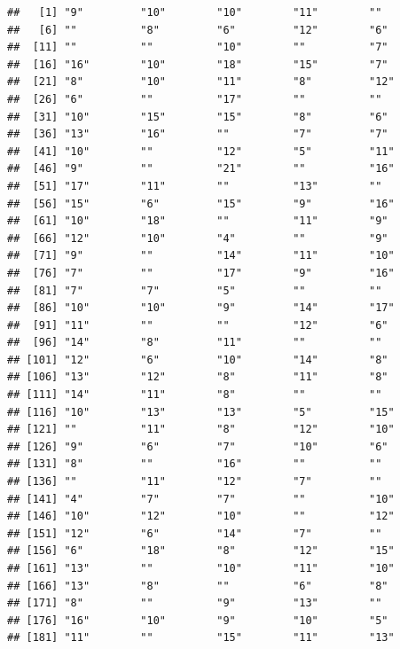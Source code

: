 \documentclass[]{book}
\theoremstyle{definition}
\theoremstyle{definition}
\theoremstyle{definition}
\theoremstyle{remark}
\begin{document}
\begin{verbatim}
##   [1] "9"         "10"        "10"        "11"        ""         
##   [6] ""          "8"         "6"         "12"        "6"        
##  [11] ""          ""          "10"        ""          "7"        
##  [16] "16"        "10"        "18"        "15"        "7"        
##  [21] "8"         "10"        "11"        "8"         "12"       
##  [26] "6"         ""          "17"        ""          ""         
##  [31] "10"        "15"        "15"        "8"         "6"        
##  [36] "13"        "16"        ""          "7"         "7"        
##  [41] "10"        ""          "12"        "5"         "11"       
##  [46] "9"         ""          "21"        ""          "16"       
##  [51] "17"        "11"        ""          "13"        ""         
##  [56] "15"        "6"         "15"        "9"         "16"       
##  [61] "10"        "18"        ""          "11"        "9"        
##  [66] "12"        "10"        "4"         ""          "9"        
##  [71] "9"         ""          "14"        "11"        "10"       
##  [76] "7"         ""          "17"        "9"         "16"       
##  [81] "7"         "7"         "5"         ""          ""         
##  [86] "10"        "10"        "9"         "14"        "17"       
##  [91] "11"        ""          ""          "12"        "6"        
##  [96] "14"        "8"         "11"        ""          ""         
## [101] "12"        "6"         "10"        "14"        "8"        
## [106] "13"        "12"        "8"         "11"        "8"        
## [111] "14"        "11"        "8"         ""          ""         
## [116] "10"        "13"        "13"        "5"         "15"       
## [121] ""          "11"        "8"         "12"        "10"       
## [126] "9"         "6"         "7"         "10"        "6"        
## [131] "8"         ""          "16"        ""          ""         
## [136] ""          "11"        "12"        "7"         ""         
## [141] "4"         "7"         "7"         ""          "10"       
## [146] "10"        "12"        "10"        ""          "12"       
## [151] "12"        "6"         "14"        "7"         ""         
## [156] "6"         "18"        "8"         "12"        "15"       
## [161] "13"        ""          "10"        "11"        "10"       
## [166] "13"        "8"         ""          "6"         "8"        
## [171] "8"         ""          "9"         "13"        ""         
## [176] "16"        "10"        "9"         "10"        "5"        
## [181] "11"        ""          "15"        "11"        "13"       

\end{verbatim}
\end{document}
